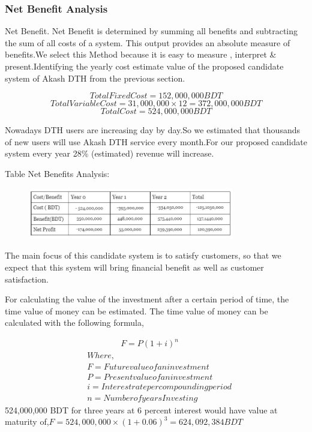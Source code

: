 \begin{spacing}{1}
\subsubsection{Net Benefit Analysis}
Net Benefit. Net Benefit is determined by summing all benefits and subtracting the sum of all costs of a system. This output provides an absolute measure of benefits.We select this Method because it is easy to measure , interpret \& present.Identifying the yearly cost estimate value of the proposed candidate system of Akash DTH from the previous section.

\[ Total Fixed Cost = 152,000,000 BDT\]
\[Total Variable Cost = 31,000,000 \times 12 = 372,000,000 BDT\]
\[ Total Cost = 524,000,000 BDT\]

Nowadays DTH users are increasing day by day.So we estimated that thousands of new users will use Akash DTH service every month.For our proposed candidate system every year 28\% (estimated) revenue will increase.

Table Net Benefits Analysis:
\begin{figure}[H]
	\centering
	\includegraphics[width=0.8\textwidth]{benefit}
	\label{fig:benefit}
\end{figure}
The main focus of this  candidate system is to satisfy customers, so that we expect that this system will bring financial benefit as well as customer satisfaction.
 
For calculating  the value of the investment after a certain period of  time, the time value of money can be estimated.
The time value of money can be calculated with the following formula,

\begin{equation*}
	\begin{split}
		&\qquad \qquad F = P (1 + i) ^n \\
		&Where, \\
		& F = Future value of an investment  \\
		& P = Present value of an investment \\
		& i =  Interest rate per compounding period \\
		& n =  Number of years Investing 
	\end{split}
\end{equation*}
 524,000,000 BDT for three years at 6 percent interest would have value at maturity of,$ F =  524,000,000 \times (1 + 0.06) ^3  = 624,092,384 BDT $


\end{spacing}
